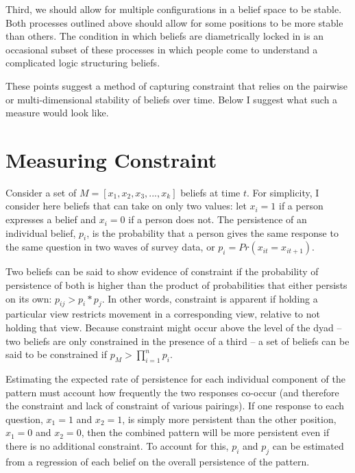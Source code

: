 \documentclass[12pt,]{article}
\begin{document}
Third, we should allow for multiple configurations in a belief space to be stable. Both processes outlined above should allow for some positions to be more stable than others. The condition in which beliefs are diametrically locked in is an occasional subset of these processes in which people come to understand a complicated logic structuring beliefs.

These points suggest a method of capturing constraint that relies on the pairwise or multi-dimensional stability of beliefs over time. Below I suggest what such a measure would look like.

\hypertarget{measuring-constraint}{%
\section{Measuring Constraint}\label{measuring-constraint}}

Consider a set of \(M = [x_1, x_2, x_3, ..., x_k]\) beliefs at time \(t\). For simplicity, I consider here beliefs that can take on only two values: let \(x_i = 1\) if a person expresses a belief and \(x_i = 0\) if a person does not. The persistence of an individual belief, \(p_i\), is the probability that a person gives the same response to the same question in two waves of survey data, or \(p_i = Pr(x_{it} = x_{it+1})\).

Two beliefs can be said to show evidence of constraint if the probability of persistence of both is higher than the product of probabilities that either persists on its own: \(p_{ij} > p_i * p_j\). In other words, constraint is apparent if holding a particular view restricts movement in a corresponding view, relative to not holding that view. Because constraint might occur above the level of the dyad -- two beliefs are only constrained in the presence of a third -- a set of beliefs can be said to be constrained if \(p_{M} > \prod_{i = 1}^np_i\).

Estimating the expected rate of persistence for each individual component of the pattern must account how frequently the two responses co-occur (and therefore the constraint and lack of constraint of various pairings). If one response to each question, \(x_1 = 1\) and \(x_2 = 1\), is simply more persistent than the other position, \(x_1 = 0\) and \(x_2 = 0\), then the combined pattern will be more persistent even if there is no additional constraint. To account for this, \(p_i\) and \(p_j\) can be estimated from a regression of each belief on the overall persistence of the pattern.
\end{document}
